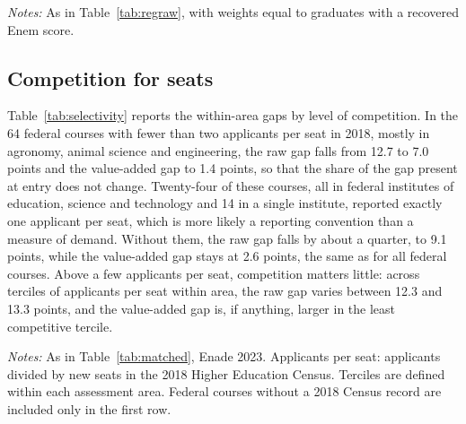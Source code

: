 \documentclass[12pt,letterpaper]{article}
\begin{document}
\begin{table}[!htbp]
\centering\small
\caption{Value added (raw IDD): regressions on administrative category, Enade 2023}\label{tab:regva}

\begin{minipage}{\linewidth}\vspace{0.4em}\scriptsize
\textit{Notes:} As in Table~\ref{tab:regraw}, with weights equal to graduates with a recovered Enem score.
\end{minipage}
\end{table}

\subsection{Competition for seats}

Table~\ref{tab:selectivity} reports the within-area gaps by level of competition. In the 64 federal courses with fewer than two applicants per seat in 2018, mostly in agronomy, animal science and engineering, the raw gap falls from 12.7 to 7.0 points and the value-added gap to 1.4 points, so that the share of the gap present at entry does not change. Twenty-four of these courses, all in federal institutes of education, science and technology and 14 in a single institute, reported exactly one applicant per seat, which is more likely a reporting convention than a measure of demand. Without them, the raw gap falls by about a quarter, to 9.1 points, while the value-added gap stays at 2.6 points, the same as for all federal courses. Above a few applicants per seat, competition matters little: across terciles of applicants per seat within area, the raw gap varies between 12.3 and 13.3 points, and the value-added gap is, if anything, larger in the least competitive tercile.

\begin{table}[!htbp]
\centering\footnotesize
\caption{Federal minus for-profit private courses, by competition for seats in 2018}\label{tab:selectivity}
\resizebox{\linewidth}{!}{}
\begin{minipage}{\linewidth}\vspace{0.4em}\scriptsize
\textit{Notes:} As in Table~\ref{tab:matched}, Enade 2023. Applicants per seat: applicants divided by new seats in the 2018 Higher Education Census. Terciles are defined within each assessment area. Federal courses without a 2018 Census record are included only in the first row.
\end{minipage}
\end{table}
\end{document}
